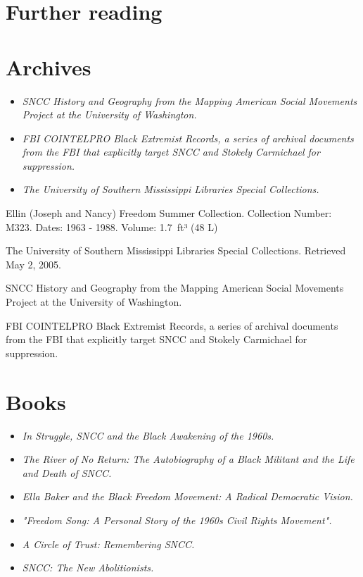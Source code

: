 \section{Further reading}\label{further-reading}

\section{Archives}\label{archives}

\begin{itemize}
\item
  \emph{SNCC History and Geography from the Mapping American Social
  Movements Project at the University of Washington.}
\item
  \emph{FBI COINTELPRO Black Extremist Records, a series of archival
  documents from the FBI that explicitly target SNCC and Stokely
  Carmichael for suppression.}
\item
  \emph{The University of Southern Mississippi Libraries Special
  Collections.}
\end{itemize}

Ellin (Joseph and Nancy) Freedom Summer Collection. Collection Number:
M323. Dates: 1963 - 1988. Volume: 1.7~ft³ (48 L)

The University of Southern Mississippi Libraries Special Collections.
Retrieved May 2, 2005.

SNCC History and Geography from the Mapping American Social Movements
Project at the University of Washington.

FBI COINTELPRO Black Extremist Records, a series of archival documents
from the FBI that explicitly target SNCC and Stokely Carmichael for
suppression.

\section{Books}\label{books}

\begin{itemize}
\item
  \emph{In Struggle, SNCC and the Black Awakening of the 1960s.}
\item
  \emph{The River of No Return: The Autobiography of a Black Militant
  and the Life and Death of SNCC.}
\item
  \emph{Ella Baker and the Black Freedom Movement: A Radical Democratic
  Vision.}
\item
  \emph{"Freedom Song: A Personal Story of the 1960s Civil Rights
  Movement".}
\item
  \emph{A Circle of Trust: Remembering SNCC.}
\item
  \emph{SNCC: The New Abolitionists.}
\end{itemize}

